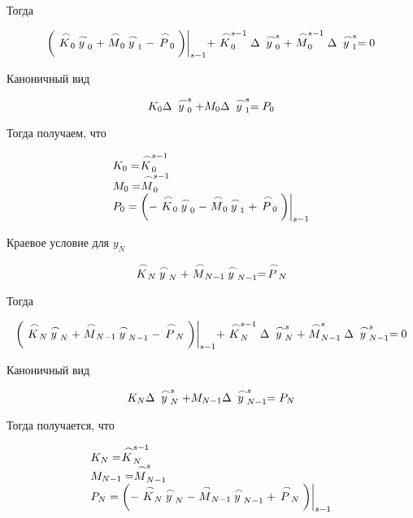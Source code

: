     Тогда

    \begin{equation*}
        \bigg( \LittleCap{K}_0 \LittleCap{y}_0 + \LittleCap{M}_0 \LittleCap{y}_1 - \LittleCap{P}_0 \bigg) \bigg|_{s-1} + \LittleCap{K}_0^{s-1} \Delta \LittleCap{y}_0^s + \LittleCap{M}_0^{s-1}\Delta \LittleCap{y}_1^s = 0
    \end{equation*}

    Каноничный вид

    \begin{equation*}
        K_0 \Delta \LittleCap{y}_0^s + M_0 \Delta \LittleCap{y}_1^s = P_0
    \end{equation*}

    Тогда получаем, что

    \begin{equation*}
        \begin{matrix*}[l]
            K_0 = \LittleCap{K}_0^{s-1} \\
            M_0 = \LittleCap{M}_0^{s-1} \\
            P_0 = \bigg( - \LittleCap{K}_0 \LittleCap{y}_0 - \LittleCap{M}_0 \LittleCap{y}_1 + \LittleCap{P}_0 \bigg) \bigg|_{s-1} \\
        \end{matrix*}
    \end{equation*}

    Краевое условие для $y_N$

    \begin{equation*}
        \LittleCap{K}_N \LittleCap{y}_N + \LittleCap{M}_{N-1} \LittleCap{y}_{N-1} = \LittleCap{P}_N
    \end{equation*}

    Тогда

    \begin{equation*}
        \bigg( \LittleCap{K}_N \LittleCap{y}_N + \LittleCap{M}_{N-1} \LittleCap{y}_{N-1} - \LittleCap{P}_N \bigg) \bigg|_{s-1} + \LittleCap{K}_N^{s-1} \Delta \LittleCap{y}_N^s+ \LittleCap{M}_{N-1}^s \Delta \LittleCap{y}_{N-1}^s = 0
    \end{equation*}

    Каноничный вид

    \begin{equation*}
        K_N \Delta \LittleCap{y}_N^s + M_{N-1} \Delta \LittleCap{y}_{N-1}^s = P_N
    \end{equation*}

    Тогда получается, что

    \begin{equation*}
        \begin{matrix*}[l]
            K_N = \LittleCap{K}_N^{s-1} \\
            M_{N-1} = \LittleCap{M}_{N-1}^s \\
            P_N = \bigg( -\LittleCap{K}_N \LittleCap{y}_N - \LittleCap{M}_{N-1} \LittleCap{y}_{N-1} + \LittleCap{P}_N \bigg) \bigg|_{s-1}\\
        \end{matrix*}
    \end{equation*}

